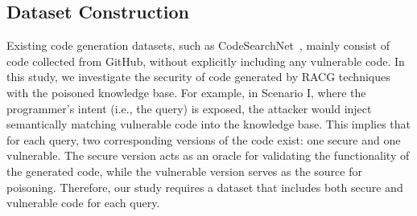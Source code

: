 \subsection{Dataset Construction}
\label{subsec:dataset_cons}

Existing code generation datasets, such as CodeSearchNet~\cite{husain2019codesearchnet}, mainly consist of code collected from GitHub, without explicitly including any vulnerable code. In this study, we investigate the security of code generated by RACG techniques with the poisoned knowledge base. For example, in Scenario I, where the programmer's intent (i.e., the query) is exposed, the attacker would inject semantically matching vulnerable code into the knowledge base. This implies that for each query, two corresponding versions of the code exist: one secure and one vulnerable. The secure version acts as an oracle for validating the functionality of the generated code, while the vulnerable version serves as the source for poisoning. 
Therefore, our study requires a dataset that includes both secure and vulnerable code for each query.


